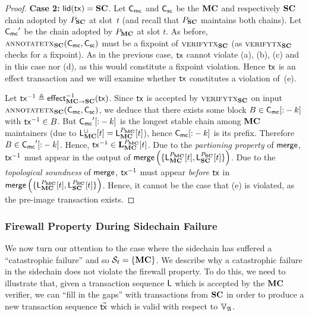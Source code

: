 \begin{proof}
  \textbf{Case 2: } $\llid(\tx) = \Sidechain$.
  Let $\chainmc$ and $\chainsc$ be the $\Mainchain$ and respectively $\Sidechain$ chain
  adopted by $\party_\Sidechain$ at slot~$t$ (and recall that $\party_\Sidechain$ maintains
  both chains). Let $\chainmc'$ be the chain adopted by
  $\party_\Mainchain$ at slot $t$. As before,
  $\textsc{annotatetx}_\Sidechain(\chainmc,\chainsc)$ must be a fixpoint of
  $\textsc{verifytx}_\Sidechain$ (as $\textsc{verifytx}_\Sidechain$ checks for a fixpoint).
  As in the previous case, $\tx$ cannot violate (a), (b), (c) and in this case
  nor (d), as this would constitute a fixpoint violation. Hence $\tx$ is an
  effect transaction and we will examine whether $\tx$ constitutes a violation
  of~(e).

  Let $\tx^{-1} \defeq \eff{\Mainchain}{\Sidechain}^{-1}(\tx)$. Since $\tx$ is accepted
  by $\textsc{verifytx}_\Sidechain$ on input
  $\textsc{annotatetx}_\Sidechain\allowbreak(\chainmc,\chainsc)$, we deduce that
  there exists some block $B \in \chainmc[{:}-k]$
  with $\tx^{-1} \in B$. But $\chainmc'[{:}-k]$
  is the longest stable chain among
  $\Mainchain$ maintainers (due to $\LState_\Mainchain^\cup[t] = \LState_\Mainchain^{\party_\Mainchain}[t]$),
  hence $\chainmc[{:}-k]$ is its prefix. Therefore
  $B \in \chainmc'[{:}-k]$.
  Hence, $\tx^{-1} \in \Ledger^{\party_\Mainchain}_\Mainchain[t]$.
  Due to the \emph{partioning property} of $\merge$, $\tx^{-1}$ must appear in
  the output of $\merge\left(
      \{\LState_\Mainchain^{\party_\Mainchain}[t], \LState_\Sidechain^{\party_\Sidechain}[t]\}
  \right)$.
  Due to the
  \emph{topological soundness} of $\merge$, $\tx^{-1}$ must appear
  \emph{before} $\tx$
  in
  $\merge\left(
      \{\LState_\Mainchain^{\party_\Mainchain}[t], \LState_\Sidechain^{\party_\Sidechain}[t]\}
  \right)$. Hence, it cannot be the case that (e) is violated, as the pre-image
  transaction exists.
\end{proof}

\subsubsection{Firewall Property During Sidechain Failure}


We now turn our attention to the case where the sidechain has suffered a
``catastrophic failure'' and so $\Secure_t = \{\Mainchain\}$. We describe why a
catastrophic failure in the sidechain does not violate the firewall property. To
do this, we need to illustrate that, given a transaction sequence $\LState$ which is
accepted by the $\Mainchain$ verifier, we can ``fill in the gaps'' with transactions
from $\Sidechain$ in order to produce a new transaction sequence $\vec\tx$ which is
valid with respect to $\adalang$.

